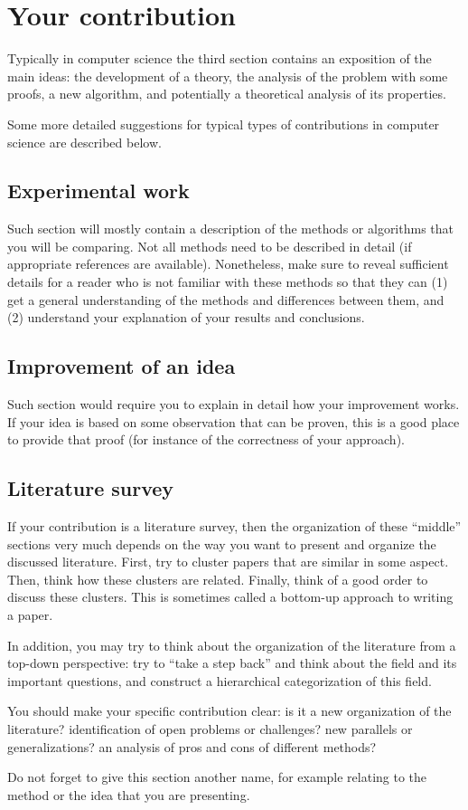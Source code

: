 \section{Your contribution}
Typically in computer science the third section contains an exposition of the main ideas: the development of a theory, the analysis of the problem with some proofs, a new algorithm, and potentially a theoretical analysis of its properties.

Some more detailed suggestions for typical types of contributions in computer science are described below.

\subsection*{Experimental work}
Such section will mostly contain a description of the methods or algorithms that you will be comparing. Not all methods need to be described in detail (if appropriate references are available). Nonetheless, make sure to reveal sufficient details for a reader who is not familiar with these methods so that they can (1) get a general understanding of the methods and differences between them, and (2) understand your explanation of your results and conclusions.

\subsection*{Improvement of an idea}
Such section would require you to explain in detail how your improvement works. If your idea is based on some observation that can be proven, this is a good place to provide that proof (for instance of the correctness of your approach).

\subsection*{Literature survey}
If your contribution is a literature survey, then the organization of these ``middle'' sections very much depends on the way you want to present and organize the discussed literature. First, try to cluster papers that are similar in some aspect. Then, think how these clusters are related. Finally, think of a good order to discuss these clusters. This is sometimes called a bottom-up approach to writing a paper.

In addition, you may try to think about the organization of the literature from a top-down perspective: try to ``take a step back'' and think about the field and its important questions, and construct a hierarchical categorization of this field.

You should make your specific contribution clear: is it a new organization of the literature? identification of open problems or challenges? new parallels or generalizations? an analysis of pros and cons of different methods? 

Do not forget to give this section another name, for example relating to the method or the idea that you are presenting.